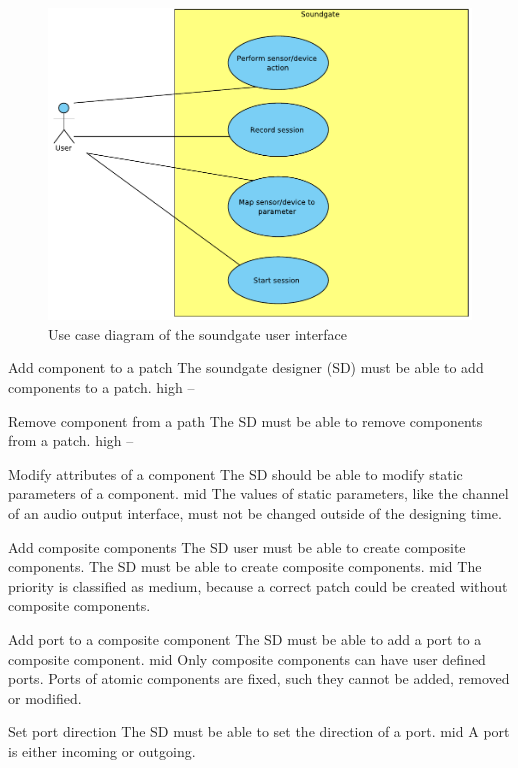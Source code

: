 	\begin{figure}[ht]
		\centering
			\includegraphics[width=\textwidth]{images/User_View.pdf}
		\caption{Use case diagram of the soundgate user interface}
		\label{fig:Soundgate_UserInterface}
	\end{figure}
	

	{Add component to a patch}
	{The soundgate designer (SD) must be able to add components to a patch.}
	{high}
	{--}
	
	{Remove component from a path}
	{The SD must be able to remove components from a patch.}
	{high}
	{--}
	
	{Modify attributes of a component}
	{The SD should be able to modify static parameters of a component.}
	{mid}
	{The values of static parameters, like the channel of an audio output interface, must not be changed outside of the designing time.}
	
	{Add composite components}
	{The SD user must be able to create composite components.}
	{The SD must be able to create composite components.}
	{mid}
	{The priority is classified as medium, because a correct patch could be created without composite components. }
	
	{Add port to a composite component}
	{The SD must be able to add a port to a composite component.}
	{mid}
	{Only composite components can have user defined ports. Ports of atomic components are fixed, such they cannot be added, removed or modified.}
	
	{Set port direction}
	{The SD must be able to set the direction of a port.}
	{mid}
	{A port is either incoming or outgoing.}
	
